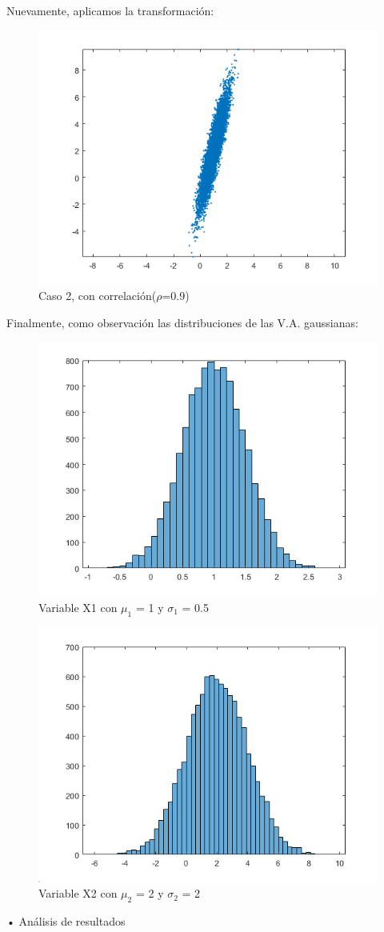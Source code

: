 Nuevamente, aplicamos la transformación:

\begin{figure}[H]
	\centering
	\includegraphics[width=0.4\linewidth]{./ImagenesEjercicio2/GaussianaBivariableCorr2.PNG}
	\caption{Caso 2, con correlación($\rho$=0.9)}
	\label{fig:C2CC}
\end{figure}

Finalmente, como observación las distribuciones de las V.A. gaussianas:

\begin{figure}[H]
	\centering
	\includegraphics[width=0.4\linewidth]{./ImagenesEjercicio2/X1b.PNG}
	\caption{Variable X1 con $\mu_1$ = 1 y $\sigma_1$ = 0.5}
	\label{fig:X1b}
\end{figure}
\begin{figure}[H]
	\centering
	\includegraphics[width=0.4\linewidth]{./ImagenesEjercicio2/X2b.PNG}
	\caption{Variable X2 con $\mu_2$ = 2 y $\sigma_2$ = 2}
	\label{fig:X2b}
\end{figure}

\begin{large}
• Análisis de resultados\\
\end{large}

